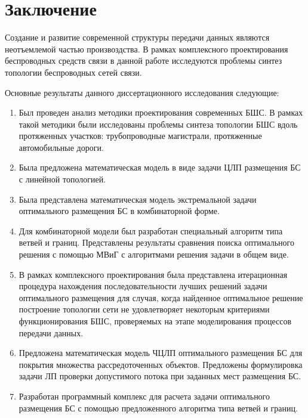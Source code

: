 \chapter*{Заключение}                       %
Создание и развитие современной структуры передачи данных являются неотъемлемой частью произвоздства. В рамках комплексного проектирования беспроводных средств связи в данной работе исследуются проблемы синтез топологии беспроводных сетей связи.

Основные результаты данного диссертационного исследования следующие:
\begin{enumerate}
    \item Был проведен анализ методики проектирования современных БШС. В рамках такой методики были исследованы проблемы синтеза топологии БШС вдоль протяженных участков: трубопроводные магистрали, протяженные автомобильные дороги. 
    \item Была предложена математическая модель в виде задачи ЦЛП размещения БС с линейной топологией.
    \item Была представлена математическая модель экстремальной задачи оптимального размещения БС в комбинаторной форме. 
    \item Для комбинаторной модели был разработан специальный алгоритм типа ветвей и границ. Представлены результаты сравнения поиска оптимального решения с помощью МВиГ с алгоритмами решения задачи в общем виде.
    \item В рамках комплексного проектирования была представлена итерационная процедура нахождения последовательности лучших решений задачи оптимального размещения для случая, когда найденное оптимальное решение построение топологии сети не удовлетворяет некоторым критериями функционирования БШС, проверяемых на этапе моделирования процессов передачи данных.
    \item Предложена математическая модель ЧЦЛП оптимального размещения БС для покрытия множества рассредоточенных объектов. Предложены формулировка задачи ЛП проверки допустимого потока при заданных мест размещения БС.
    \item Разработан программный комплекс для расчета задачи оптимального размещения БС  с помощью предложенного алгоритма типа ветвей и границ.
\end{enumerate}


